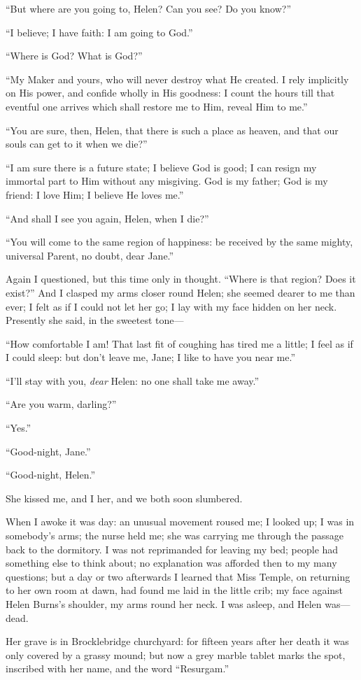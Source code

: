 \enquote{But where are you going to, Helen? Can you see? Do you know?}

\enquote{I believe; I have faith: I am going to God.}

\enquote{Where is God? What is God?}

\enquote{My Maker and yours, who will never destroy what He created. I
	rely implicitly on His power, and confide wholly in His goodness: I
	count the hours till that eventful one arrives which shall restore me to
	Him, reveal Him to me.}

\enquote{You are sure, then, Helen, that there is such a place as
	heaven, and that our souls can get to it when we die?}

\enquote{I am sure there is a future state; I believe God is good; I can
	resign my immortal part to Him without any misgiving. God is my father;
	God is my friend: I love Him; I believe He loves me.}

\enquote{And shall I see you again, Helen, when I die?}

\enquote{You will come to the same region of happiness: be received by
	the same mighty, universal Parent, no doubt, dear Jane.}

Again I questioned, but this time only in thought. \enquote{Where is
	that region? Does it exist?} And I clasped my arms closer round Helen;
she seemed dearer to me than ever; I felt as if I could not let her go;
I lay with my face hidden on her neck. Presently she said, in the
sweetest tone---

\enquote{How comfortable I am! That last fit of coughing has tired me a
	little; I feel as if I could sleep: but don't leave me, Jane; I like to
	have you near me.}

\enquote{I'll stay with you, \emph{dear} Helen: no one shall take me away.}

\enquote{Are you warm, darling?}

\enquote{Yes.}

\enquote{Good-night, Jane.}

\enquote{Good-night, Helen.}

She kissed me, and I her, and we both soon slumbered.

When I awoke it was day: an unusual movement roused me; I looked up; I
was in somebody's arms; the nurse held me; she was carrying me through
the passage back to the dormitory. I was not reprimanded for leaving my
bed; people had something else to think about; no explanation was
afforded then to my many questions; but a day or two afterwards I
learned that Miss Temple, on returning to her own room at dawn, had
found me laid in the little crib; my face against Helen Burns's
shoulder, my arms round her neck. I was asleep, and Helen was---dead.

Her grave is in Brocklebridge churchyard: for fifteen years after her
death it was only covered by a grassy mound; but now a grey marble
tablet marks the spot, inscribed with her name, and the word
\enquote{Resurgam.}
